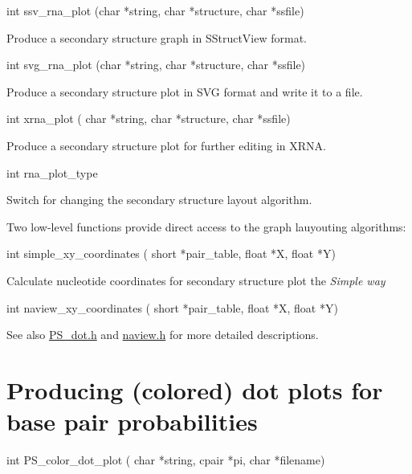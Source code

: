 \begin{DoxyVerb}int ssv_rna_plot (char *string,
                  char *structure,
                  char *ssfile)
\end{DoxyVerb}
 Produce a secondary structure graph in S\+Struct\+View format.

\begin{DoxyVerb}int svg_rna_plot (char *string,
                  char *structure,
                  char *ssfile)
\end{DoxyVerb}
 Produce a secondary structure plot in S\+VG format and write it to a file.

\begin{DoxyVerb}int xrna_plot ( char *string,
                char *structure,
                char *ssfile)
\end{DoxyVerb}
 Produce a secondary structure plot for further editing in X\+R\+NA.

\begin{DoxyVerb}int rna_plot_type
\end{DoxyVerb}
 Switch for changing the secondary structure layout algorithm.

Two low-\/level functions provide direct access to the graph lauyouting algorithms\+:

\begin{DoxyVerb}int simple_xy_coordinates ( short *pair_table,
                            float *X,
                            float *Y)
\end{DoxyVerb}
 Calculate nucleotide coordinates for secondary structure plot the {\itshape Simple way}

\begin{DoxyVerb}int naview_xy_coordinates ( short *pair_table,
                            float *X,
                            float *Y)
\end{DoxyVerb}


\begin{DoxySeeAlso}{See also}
\mbox{\hyperlink{PS__dot_8h}{P\+S\+\_\+dot.\+h}} and \mbox{\hyperlink{naview_8h}{naview.\+h}} for more detailed descriptions.
\end{DoxySeeAlso}
\hypertarget{mp_utils_utils_dot}{}\section{Producing (colored) dot plots for base pair probabilities}\label{mp_utils_utils_dot}
\begin{DoxyVerb}int PS_color_dot_plot ( char *string,
                        cpair *pi,
                        char *filename)
\end{DoxyVerb}


